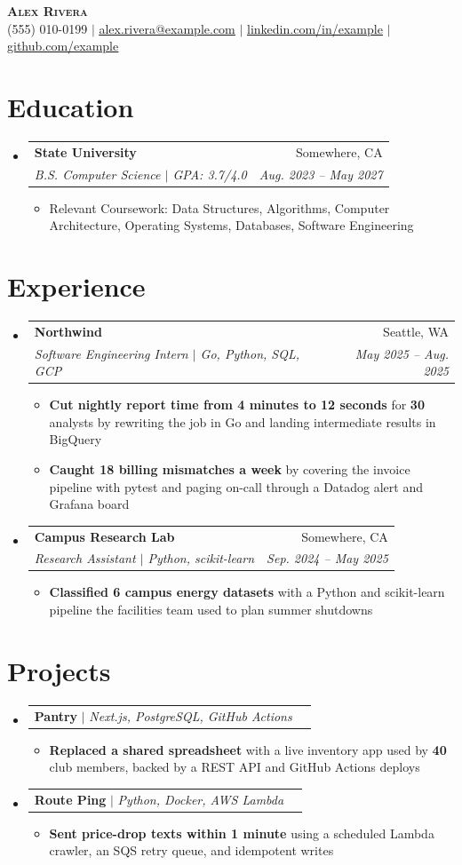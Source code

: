\documentclass[letterpaper,10pt]{article}
\makeatletter
\newcommand{\resumeItem}[1]{%
  \item\small{#1}\vspace{-1pt}%
}
\newcommand{\resumeSubheading}[4]{
  \vspace{-1pt}\item\small
    \begin{tabular*}{0.97\textwidth}[t]{l@{\extracolsep{\fill}}r}
      \textbf{#1} & #2 \\
      \textit{#3} & \textit{#4} \\
      \end{tabular*}\vspace{-4pt}
}
\newcommand{\resumeProjectHeading}[2]{
    \item\small
    \begin{tabular*}{0.97\textwidth}{l@{\extracolsep{\fill}}r}
      #1 & #2 \\
    \end{tabular*}\vspace{-4pt}
}
\newcommand{\resumeSubHeadingListStart}{\begin{itemize}[leftmargin=0.12in, label={}, itemsep=1pt]}
\newcommand{\resumeSubHeadingListEnd}{\end{itemize}}
\newcommand{\resumeItemListStart}{\begin{itemize}[leftmargin=0.15in, itemsep=1.5pt, topsep=1pt]}
\newcommand{\resumeItemListEnd}{\end{itemize}\vspace{-2pt}}
\makeatother
\begin{document}
\begin{center}
    \textbf{\Huge \scshape Alex Rivera} \\ \vspace{3pt}
    \small (555) 010-0199 $|$ \href{mailto:alex.rivera@example.com}{\underline{alex.rivera@example.com}} $|$
    \href{https://www.linkedin.com/in/example}{\underline{linkedin.com/in/example}} $|$
    \href{https://github.com/example}{\underline{github.com/example}}
\end{center}


\section{Education}
  \resumeSubHeadingListStart
    \resumeSubheading
      {State University}{Somewhere, CA}
      {B.S. Computer Science $|$ GPA: 3.7/4.0}{Aug. 2023 -- May 2027}
      \resumeItemListStart
        \resumeItem{Relevant Coursework: Data Structures, Algorithms, Computer Architecture, Operating Systems, Databases, Software Engineering}
      \resumeItemListEnd
  \resumeSubHeadingListEnd


\section{Experience}
  \resumeSubHeadingListStart

    \resumeSubheading
      {Northwind}{Seattle, WA}
      {Software Engineering Intern $|$ Go, Python, SQL, GCP}{May 2025 -- Aug. 2025}
      \resumeItemListStart
        \resumeItem{\textbf{Cut nightly report time from 4 minutes to 12 seconds} for \textbf{30} analysts by rewriting the job in Go and landing intermediate results in BigQuery}
        \resumeItem{\textbf{Caught 18 billing mismatches a week} by covering the invoice pipeline with pytest and paging on-call through a Datadog alert and Grafana board}
      \resumeItemListEnd

    \resumeSubheading
      {Campus Research Lab}{Somewhere, CA}
      {Research Assistant $|$ Python, scikit-learn}{Sep. 2024 -- May 2025}
      \resumeItemListStart
        \resumeItem{\textbf{Classified 6 campus energy datasets} with a Python and scikit-learn pipeline the facilities team used to plan summer shutdowns}
      \resumeItemListEnd

  \resumeSubHeadingListEnd


\section{Projects}
    \resumeSubHeadingListStart
      \resumeProjectHeading
          {\textbf{Pantry} $|$ \emph{Next.js, PostgreSQL, GitHub Actions}}{}
          \resumeItemListStart
            \resumeItem{\textbf{Replaced a shared spreadsheet} with a live inventory app used by \textbf{40} club members, backed by a REST API and GitHub Actions deploys}
          \resumeItemListEnd
      \resumeProjectHeading
          {\textbf{Route Ping} $|$ \emph{Python, Docker, AWS Lambda}}{}
          \resumeItemListStart
            \resumeItem{\textbf{Sent price-drop texts within 1 minute} using a scheduled Lambda crawler, an SQS retry queue, and idempotent writes}
          \resumeItemListEnd
    \resumeSubHeadingListEnd
\end{document}
